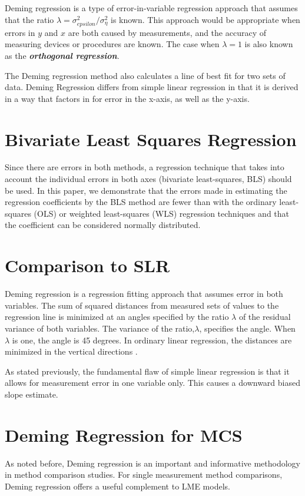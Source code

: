 \documentclass[12pt, a4paper]{report}
\theoremstyle{plain}
\theoremstyle{definition}
\theoremstyle{remark}
\begin{document}
Deming regression is a type of error-in-variable regression approach that assumes that the ratio $\lambda = \sigma^2_{epsilon}/\sigma^2_{\eta}$ is known. This approach would be appropriate when errors in $y$ and $x$ are both caused by measurements, and the accuracy of measuring devices or procedures are known. The case when $\lambda = 1$ is also known as the \textbf{\emph{orthogonal regression}}.

The Deming regression method also calculates a line of best fit for two sets of data. Deming Regression differs from simple linear regression in that it is derived in a way that factors in for error in the x-axis, as well as the y-axis.


\section{Bivariate Least Squares Regression} Since there
are errors in both methods, a regression technique that takes into account the individual errors in both axes (bivariate least-squares, BLS) should be used. In this paper, we demonstrate that the errors made in estimating the regression coefficients by the BLS method are fewer than with the ordinary least-squares (OLS) or weighted least-squares (WLS) regression techniques and that the coefficient can be considered normally distributed.


\section{Comparison to SLR}

Deming regression is a regression fitting approach that assumes error in both variables.
The sum of squared distances from measured sets of values to the regression line is minimized at an angles specified by the ratio $\lambda$ of the residual variance of both variables. The variance of the ratio,$\lambda$, specifies the angle.  When $\lambda$ is one, the angle is 45 degrees. In ordinary linear regression, the distances are minimized in the vertical directions \citep{linnet99}.

As stated previously, the fundamental flaw of simple linear regression is that it allows for measurement error in one variable only. This causes a downward biased slope estimate.



\section{Deming Regression for MCS}
As noted before, Deming regression is an important and informative methodology in method comparison studies.
For single measurement method comparisons, Deming regression offers a useful complement to LME models.
\end{document}
